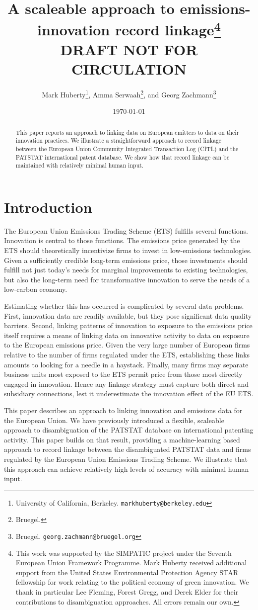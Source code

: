 \documentclass[11pt]{article}
\title{A scaleable approach to emissions-innovation record linkage\thanks{This
    work was supported by the SIMPATIC project under the Seventh European Union Framework Programme. Mark Huberty received additional support from the United States
    Environmental Protection Agency STAR fellowship for work relating to
    the political economy of green innovation. We thank in particular
    Lee Fleming, Forest Gregg, and Derek Elder for their contributions
    to disambiguation approaches. All errors remain our own.}\\
  DRAFT NOT FOR CIRCULATION}
\author{Mark Huberty\thanks{University of California,
    Berkeley. \texttt{markhuberty@berkeley.edu}}, Amma
  Serwaah\thanks{Bruegel.}, and Georg Zachmann\thanks{Bruegel. \texttt{georg.zachmann@bruegel.org}}}
\date{\today}
\begin{document}
\maketitle
\doublespacing

\begin{abstract}
  This paper reports an approach to linking data on European emitters
  to data on their innovation practices. We illustrate a
  straightforward approach to record linkage between the European
  Union Community Integrated Transaction Log (CITL) and the PATSTAT
  international patent database. We show how that record linkage can
  be maintained with relatively minimal human input. 
\end{abstract}

\section{Introduction}
\label{sec:introduction}

The European Union Emissions Trading Scheme (ETS) fulfills several
functions. Innovation is central to those functions. The emissions
price generated by the ETS should theoretically incentivize firms to
invest in low-emissions technologies. Given a sufficiently credible
long-term emissions price, those investments should fulfill not just
today's needs for marginal improvements to existing technologies, but
also the long-term need for transformative innovation to serve the
needs of a low-carbon economy. 

Estimating whether this has occurred is complicated by several data
problems. First, innovation data are readily available, but they pose
significant data quality barriers. Second, linking patterns of
innovation to exposure to the emissions price itself requires a means
of linking data on innovative activity to data on exposure to the
European emissions price. Given the very large number of European
firms relative to the number of firms regulated under the ETS,
establishing these links amounts to looking for a needle in a
haystack. Finally, many firms may separate business units most exposed
to the ETS permit price from those most directly engaged in
innovation. Hence any linkage strategy must capture both direct and
subsidiary connections, lest it underestimate the innovation effect of
the EU ETS.

This paper describes an approach to linking innovation and emissions
data for the European Union. We \citep{huberty2013a} have previously
introduced a flexible, scaleable approach to disambiguation of the
PATSTAT database on international patenting activity. This paper builds on that result, providing a
machine-learning based approach to record linkage between the
disambiguated PATSTAT data and firms regulated by the European Union
Emissions Trading Scheme. We
illustrate that this approach can achieve relatively high levels of
accuracy with minimal human input.
\end{document}
